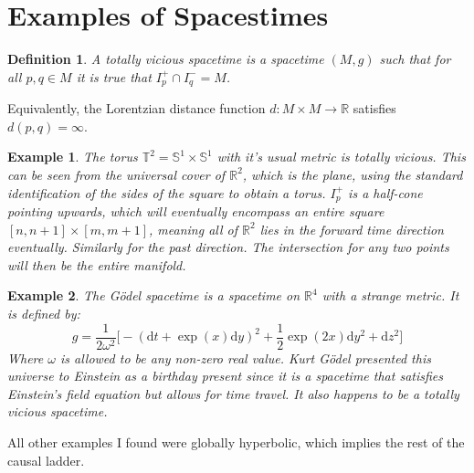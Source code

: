 \documentclass{article}
\theoremstyle{plain}
\theoremstyle{thmit}
\theoremstyle{normal}
\newtheorem{example}{Example}[section]
\newtheorem{definition}{Definition}[section]
\begin{document}
    \section{Examples of Spacestimes}
        \begin{definition}
            A totally vicious spacetime is a spacetime $(M,g)$ such that for
            all $p,q\in{M}$ it is true that $I_{p}^{+}\cap{I}_{q}^{-}=M$.
        \end{definition}
        Equivalently, the Lorentzian distance function
        $d:M\times{M}\rightarrow\mathbb{R}$ satisfies $d(p,q)=\infty$.
        \begin{example}
            The torus $\mathbb{T}^{2}=\mathbb{S}^{1}\times\mathbb{S}^{1}$ with
            it's usual metric is totally vicious. This can be seen from the
            universal cover of $\mathbb{R}^{2}$, which is the plane, using the
            standard identification of the sides of the square to obtain a
            torus. $I_{p}^{+}$ is a half-cone pointing upwards, which will
            eventually encompass an entire square $[n,n+1]\times[m,m+1]$,
            meaning all of $\mathbb{R}^{2}$ lies in the forward time direction
            eventually. Similarly for the past direction. The intersection for
            any two points will then be the entire manifold.
        \end{example}
        \begin{example}
            The G\"{o}del spacetime is a spacetime on $\mathbb{R}^{4}$ with a
            strange metric. It is defined by:
            \begin{equation}
                g=\frac{1}{2\omega^{2}}\Big[
                    -(\textrm{d}t+\exp(x)\textrm{d}y)^{2}+
                    \frac{1}{2}\exp(2x)\textrm{d}y^{2}
                    +\textrm{d}z^{2}
                \Big]
            \end{equation}
            Where $\omega$ is allowed to be any non-zero real value.
            Kurt G\"{o}del presented this universe to Einstein as a birthday
            present since it is a spacetime that satisfies Einstein's field
            equation but allows for time travel. It also happens to be a
            totally vicious spacetime.
        \end{example}
        All other examples I found were globally hyperbolic, which implies the
        rest of the causal ladder.
\end{document}
